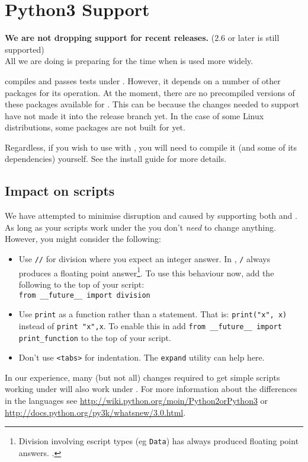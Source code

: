 \chapter{Python3 Support}\label{app:py3}

\textbf{We are not dropping support for recent \pythontwo releases.} ($2.6$ or later is still supported) \\
All we are doing is preparing for the time when \pythonthree is used more widely.

\escript compiles and passes tests under \pythonthree.
However, it depends on a number of other packages for its operation.
At the moment, there are no precompiled versions of these packages available for \pythonthree.
This can be because the changes needed to support \pythonthree have not made it into the 
release branch yet. 
In the case of some Linux distributions, some packages are not built for \pythonthree yet.

Regardless, if you wish to use \escript with \pythonthree, you will need to compile it (and some of
its dependencies) yourself.
See the install guide for more details. 

\section{Impact on scripts}
We have attempted to minimise disruption and caused by supporting both \pythontwo and \pythonthree.
As long as your scripts work under the \pythontwo you don't \emph{need} to change anything.
However, you might consider the following:
\begin{itemize}
 \item Use \texttt{//} for division where you expect an integer answer. 
In \pythonthree, \texttt{/} always produces a floating point answer\footnote{Division involving escript types (eg \texttt{Data}) has always produced floating point answers. 
.}.
To use this behaviour now, add the following to the top of your script:\\
\texttt{from __future__ import division}
\item Use \texttt{print} as a function rather than a statement.
That is:  \texttt{print("x", x)}  instead of \texttt{print "x",x}.
To enable this in \pythontwo add \texttt{from __future__ import print_function} to the top of your script.
\item{Don't use \verb|<tabs>| for indentation.  The \texttt{expand} utility can help here.}
\end{itemize}

In our experience, many (but not all) changes required to get simple scripts working under \pythonthree will also
work under \pythontwo.
For more information about the differences in the languages see \url{http://wiki.python.org/moin/Python2orPython3} 
or \url{http://docs.python.org/py3k/whatsnew/3.0.html}.